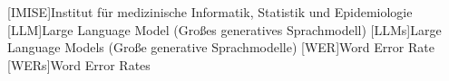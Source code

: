 \begin{acronym}[SPARQL]
[IMISE]{Institut für medizinische Informatik, Statistik und Epidemiologie}
[LLM]{Large Language Model (Großes generatives Sprachmodell)}
[LLMs]{Large Language Models (Große generative Sprachmodelle)}
[WER]{Word Error Rate}
[WERs]{Word Error Rates}
\end{acronym}
